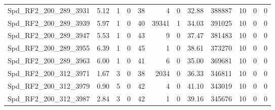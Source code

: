 \begin{longtable}[c]{@{}lrrrrrrrrrrr@{}}
Spd\_RF2\_200\_289\_3931      & 5.12                   & 1                       & 0                       & 38                     & 4                       & 0                       & 32.88                   & 388887                   & 10                       & 0                        & 0                        \\
Spd\_RF2\_200\_289\_3939      & 5.97                   & 1                       & 0                       & 40                     & 39341                   & 1                       & 34.03                   & 391025                   & 10                       & 0                        & 0                        \\
Spd\_RF2\_200\_289\_3947      & 5.53                   & 1                       & 0                       & 43                     & 9                       & 0                       & 37.47                   & 381483                   & 10                       & 0                        & 0                        \\
Spd\_RF2\_200\_289\_3955      & 6.39                   & 1                       & 0                       & 45                     & 1                       & 0                       & 38.61                   & 373270                   & 10                       & 0                        & 0                        \\
Spd\_RF2\_200\_289\_3963      & 6.00                   & 1                       & 0                       & 41                     & 6                       & 0                       & 35.00                   & 369681                   & 10                       & 0                        & 0                        \\
Spd\_RF2\_200\_312\_3971      & 1.67                   & 3                       & 0                       & 38                     & 2034                    & 0                       & 36.33                   & 346811                   & 10                       & 0                        & 0                        \\
Spd\_RF2\_200\_312\_3979      & 0.90                   & 5                       & 0                       & 42                     & 4                       & 0                       & 41.10                   & 343019                   & 10                       & 0                        & 0                        \\
Spd\_RF2\_200\_312\_3987      & 2.84                   & 3                       & 0                       & 42                     & 1                       & 0                       & 39.16                   & 345676                   & 10                       & 0                        & 0                        \\

\end{longtable}
